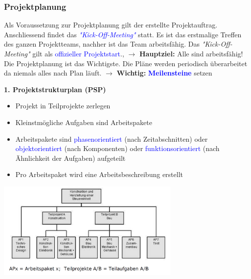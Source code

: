 \subsubsection{Projektplanung}
Als Voraussetzung zur Projektplanung gilt der erstellte Projektauftrag. Anschliessend findet das \textcolor{blue}{\textit{"Kick-Off-Meeting"}} statt. Es ist das erstmalige Treffen des ganzen Projektteams, nachher ist das Team arbeitsfähig. \newline Das \textit{"Kick-Off-Meeting"} gilt als \textcolor{blue}{offizieller Projektstart}., $\rightarrow$ \textbf{Hauptziel:} Alle sind arbeitsfähig!\\
Die Projektplanung ist das Wichtigste. Die Pläne werden periodisch überarbeitet da niemals alles nach Plan läuft. \newline 
$\rightarrow$ \textbf{Wichtig:} \textcolor{blue}{\textbf{Meilensteine}} setzen
\vspace{0.2cm}
\\
\begin{minipage}{10cm}
	\textbf{1. Projektstrukturplan (PSP)}
	\begin{itemize}
		\item Projekt in Teilprojekte zerlegen
		\item Kleinstmögliche Aufgaben sind Arbeitspakete
		\item Arbeitspakete sind \textcolor{blue}{phasenorientiert} (nach Zeitabschnitten) oder \textcolor{blue}{objektorientiert} (nach Komponenten) oder \textcolor{blue}{funktionsorientiert} (nach Ähnlichkeit der Aufgaben) aufgeteilt
		\item Pro Arbeitspaket wird eine Arbeitsbeschreibung erstellt
	\end{itemize} 	
\end{minipage}
\begin{minipage}{9cm}
	\includegraphics[width=9cm]{images/PSP.png}
\end{minipage}
\clearpage
\pagebreak

